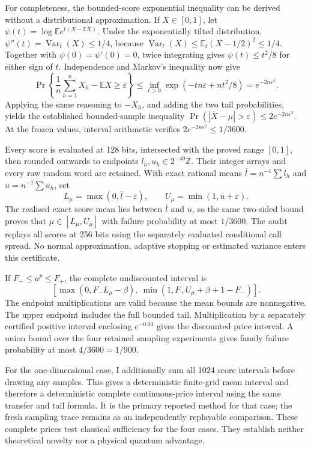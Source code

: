For completeness, the bounded-score exponential inequality can be derived
without a distributional approximation.  If \(X\in[0,1]\), let
\(\psi(t)=\log\mathbb E e^{t(X-\mathbb E X)}\).  Under the exponentially
tilted distribution, \(\psi''(t)=\operatorname{Var}_t(X)\leq1/4\), because
\(\operatorname{Var}_t(X)\leq\mathbb E_t(X-1/2)^2\leq1/4\).
Together with \(\psi(0)=\psi'(0)=0\), twice integrating gives
\(\psi(t)\leq t^2/8\) for either sign of \(t\).  Independence and Markov's
inequality now give
\[
 \Pr\!\left\{\frac1n\sum_{h=1}^nX_h-\mathbb E X\geq\varepsilon\right\}
 \leq\inf_{t>0}\exp\!\left(-tn\varepsilon+nt^2/8\right)
 =e^{-2n\varepsilon^2}.
\]
Applying the same reasoning to \(-X_h\), and adding the two tail
probabilities, yields the established bounded-sample inequality
\(\Pr(|\overline X-\mu|>\varepsilon)\leq2e^{-2n\varepsilon^2}\).
At the frozen values, interval arithmetic verifies
\(2e^{-2n\varepsilon^2}\leq1/3600\).

Every score is evaluated at 128 bits, intersected with the proved range
\([0,1]\), then rounded outwards to endpoints
\(l_h,u_h\in2^{-40}\mathbb Z\).  Their integer arrays and every raw random
word are retained.  With exact rational means
\(\overline l=n^{-1}\sum l_h\) and
\(\overline u=n^{-1}\sum u_h\), set
\[
 L_\mu=\max(0,\overline l-\varepsilon),\qquad
 U_\mu=\min(1,\overline u+\varepsilon).
\]
The realised exact score mean lies between \(\overline l\) and
\(\overline u\), so the same two-sided bound proves that
\(\mu\in[L_\mu,U_\mu]\) with failure probability at most \(1/3600\).
The audit replays all scores at 256 bits using the separately evaluated
conditional call spread.  No normal approximation, adaptive stopping or
estimated variance enters this certificate.

If \(F_-\leq a^p\leq F_+\), the complete undiscounted interval is
\[
 \left[\max(0,F_-L_\mu-\beta),\
       \min(1,F_+U_\mu+\beta+1-F_-)\right].
\]
The endpoint multiplications are valid because the mean bounds are
nonnegative.  The upper endpoint includes the full bounded tail.
Multiplication by a separately certified positive interval enclosing
\(e^{-0.03}\) gives the discounted price interval.  A union bound over the
four retained sampling experiments gives family failure probability at
most \(4/3600=1/900\).

For the one-dimensional case, I additionally sum all 1024 score intervals
before drawing any samples.  This gives a deterministic finite-grid mean
interval and therefore a deterministic complete continuous-price interval
using the same transfer and tail formula.  It is the primary reported
method for that case; the fresh sampling trace remains as an independently
replayable comparison.  These complete prices test classical sufficiency
for the four cases.  They establish neither theoretical novelty nor a
physical quantum advantage.
